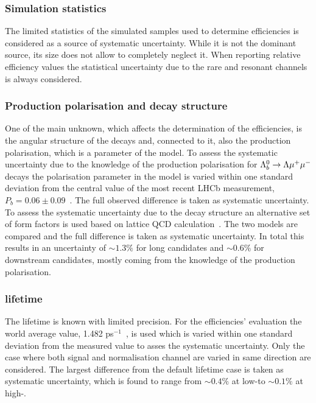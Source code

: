 \subsubsection{Simulation statistics}

The limited statistics of the simulated samples used to determine efficiencies is considered as a source of systematic uncertainty.
While it is not the dominant source, its size does not allow to completely neglect it.
When reporting relative efficiency values the statistical uncertainty due to the  rare and resonant channels
is always considered. 

\subsubsection{Production polarisation and decay structure}
\label{sec:BRpolsys}

One of the main unknown, which affects the determination of the efficiencies, is the angular structure of
the decays and, connected to it, also the production polarisation, which is a parameter of the model.
%
To assess the systematic uncertainty due to the knowledge of the production polarisation for $\Lambda^0_b\rightarrow\Lambda\mu^+\mu^-$ decays
the polarisation parameter in the model is varied within one standard deviation from the central value of the
most recent LHCb measurement, $P_b = 0.06 \pm 0.09$~\cite{Aaij:2013oxa}. The full observed difference is
taken as systematic uncertainty. To assess the systematic uncertainty due to the decay structure
an alternative set of form factors is used based on lattice QCD calculation~\cite{Detmold:2012vy}. 
The two models are compared and the full difference is taken as systematic uncertainty.
%
In total this results in an uncertainty of $\sim 1.3\%$ for long candidates and $\sim 0.6\%$ for downstream
candidates, mostly coming from the knowledge of the production polarisation.

\subsubsection{\Lb lifetime}

The \Lb lifetime is known with limited precision. For the efficiencies' evaluation the
world average value, 1.482 ps$^{-1}$~\cite{Aaij:2013oha}, is used which is
varied within one standard deviation from the measured value to asses the systematic uncertainty.
Only the case where both signal and normalisation channel are varied in same direction are considered.
The largest difference from the default lifetime case is taken as systematic uncertainty,
which is found to range from $\sim 0.4\%$ at low-\qsq to $\sim 0.1\%$ at high-\qsq.

